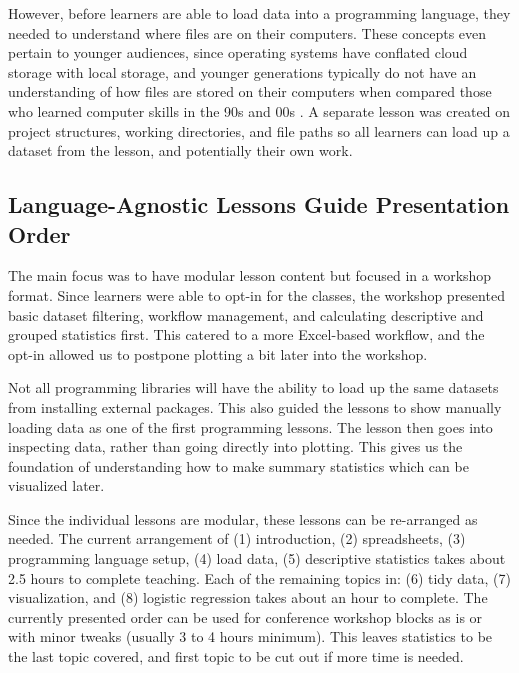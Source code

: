 \documentclass[030-workshop.tex]{subfiles}
\begin{document}
        However, before learners are able to load data into a programming language,
        they needed to understand where files are on their computers.
        These concepts even pertain to younger audiences,
        since operating systems have conflated cloud storage with local storage,
        and younger generations typically do not have an understanding of how files are stored on their computers
        when compared those who learned computer skills in the 90s and 00s
        \cite{chinFileNotFound2021}. %
        A separate lesson was created on project structures, working directories, and file paths
        so all learners can load up a dataset from the lesson, and potentially their own work.

    \subsection{Language-Agnostic Lessons Guide Presentation Order}

        The main focus was to have modular lesson content but focused in a workshop format.
        Since learners were able to opt-in for the classes,
        the workshop presented basic dataset filtering, workflow management, and calculating descriptive and grouped statistics first.
        This catered to a more Excel-based workflow,
        and the opt-in allowed us to postpone plotting a bit later into the workshop.

        Not all programming libraries will have the ability to load up the same datasets from installing external packages.
        This also guided the lessons to show manually loading data as one of the first programming lessons.
        The lesson then goes into inspecting data, rather than going directly into plotting.
        This gives us the foundation of understanding how to make summary statistics which can be visualized later.

        Since the individual lessons are modular, these lessons can be re-arranged as needed.
        The current arrangement of
        (1) introduction,
        (2) spreadsheets,
        (3) programming language setup,
        (4) load data,
        (5) descriptive statistics
        takes about 2.5 hours to complete teaching.
        Each of the remaining topics in:
        (6) tidy data,
        (7) visualization, and
        (8) logistic regression
        takes about an hour to complete.
        The currently presented order can be used for conference workshop blocks as is or with minor tweaks (usually 3 to 4 hours minimum).
        This leaves statistics to be the last topic covered, and first topic to be cut out if more time is needed.
\end{document}
